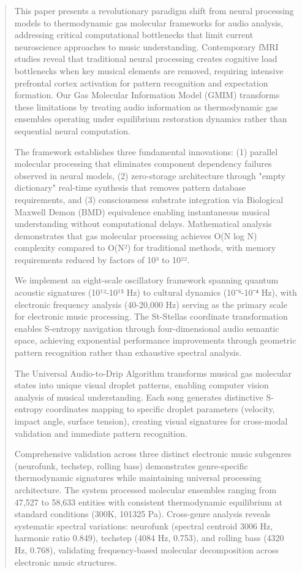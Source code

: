 \begin{abstract}

This paper presents a revolutionary paradigm shift from neural processing models to thermodynamic gas molecular frameworks for audio analysis, addressing critical computational bottlenecks that limit current neuroscience approaches to music understanding. Contemporary fMRI studies reveal that traditional neural processing creates cognitive load bottlenecks when key musical elements are removed, requiring intensive prefrontal cortex activation for pattern recognition and expectation formation. Our Gas Molecular Information Model (GMIM) transforms these limitations by treating audio information as thermodynamic gas ensembles operating under equilibrium restoration dynamics rather than sequential neural computation.

The framework establishes three fundamental innovations: (1) parallel molecular processing that eliminates component dependency failures observed in neural models, (2) zero-storage architecture through "empty dictionary" real-time synthesis that removes pattern database requirements, and (3) consciousness substrate integration via Biological Maxwell Demon (BMD) equivalence enabling instantaneous musical understanding without computational delays. Mathematical analysis demonstrates that gas molecular processing achieves O(N log N) complexity compared to O(N²) for traditional methods, with memory requirements reduced by factors of 10³ to 10²².

We implement an eight-scale oscillatory framework spanning quantum acoustic signatures (10¹²-10¹⁵ Hz) to cultural dynamics (10⁻⁶-10⁻⁴ Hz), with electronic frequency analysis (40-20,000 Hz) serving as the primary scale for electronic music processing. The St-Stellas coordinate transformation enables S-entropy navigation through four-dimensional audio semantic space, achieving exponential performance improvements through geometric pattern recognition rather than exhaustive spectral analysis.

The Universal Audio-to-Drip Algorithm transforms musical gas molecular states into unique visual droplet patterns, enabling computer vision analysis of musical understanding. Each song generates distinctive S-entropy coordinates mapping to specific droplet parameters (velocity, impact angle, surface tension), creating visual signatures for cross-modal validation and immediate pattern recognition.

Comprehensive validation across three distinct electronic music subgenres (neurofunk, techstep, rolling bass) demonstrates genre-specific thermodynamic signatures while maintaining universal processing architecture. The system processed molecular ensembles ranging from 47,527 to 58,633 entities with consistent thermodynamic equilibrium at standard conditions (300K, 101325 Pa). Cross-genre analysis reveals systematic spectral variations: neurofunk (spectral centroid 3006 Hz, harmonic ratio 0.849), techstep (4084 Hz, 0.753), and rolling bass (4320 Hz, 0.768), validating frequency-based molecular decomposition across electronic music structures.


\end{abstract}
